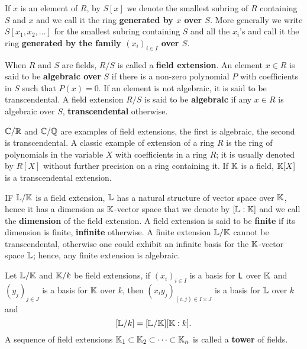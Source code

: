 If $x$ is an element of $R$, by $S[x]$ we denote the smallest subring
of $R$ containing $S$ and $x$ and we call it the ring
\textbf{generated by $x$ over $S$}. More
generally we write $S[x_1,x_2,\ldots]$ for the smallest subring
containing $S$ and all the $x_i$'s and call it the ring \textbf{generated by
the family $(x_i)_{i\in I}$ over $S$}.

When $R$ and $S$ are fields, $R/S$ is called a
 \textbf{field
  extension}. An element $x\in R$ is said to be
\textbf{algebraic over} $S$ if there is a
non-zero polynomial $P$ with coefficients in $S$ such that
$P(x)=0$. If an element is not algebraic, it is said to be
transcendental. A field extension $R/S$
is said to be \textbf{algebraic} if any
$x\in R$ is algebraic over $S$,
\textbf{transcendental} otherwise.

$\mathbb{C}/\mathbb{R}$ and $\mathbb{C}/\mathbb{Q}$ are examples of field extensions, the first is
algebraic, the second is transcendental. A classic example of
extension of a ring $R$ is the ring of polynomials in the variable $X$
with coefficients in a ring $R$; it is usually denoted by $R[X]$
without further precision on a ring containing it. If $\mathbb{K}$ is a field,
$\mathbb{K}[X]$ is a transcendental extension.

IF $\mathbb{L}/\mathbb{K}$ is a field extension, $\mathbb{L}$ has a natural structure of
vector space over $\mathbb{K}$, hence it has a dimension as $\mathbb{K}$-vector space
that we denote by $[\mathbb{L}:\mathbb{K}]$ and we call the
\textbf{dimension} of the field
extension. A field extension is said to be
\textbf{finite} if its dimension is
finite, \textbf{infinite} otherwise. A
finite extension $\mathbb{L}/\mathbb{K}$ cannot be transcendental, otherwise one
could exhibit an infinite basis for the $\mathbb{K}$-vector space $\mathbb{L}$;
hence, any finite extension is algebraic.

Let $\mathbb{L}/\mathbb{K}$ and $\mathbb{K}/k$ be field extensions, if $(x_i)_{i\in I}$ is a
basis for $\mathsf{L}$ over $\mathbb{K}$ and $(y_j)_{j\in J}$ is a basis for $\mathbb{K}$ over
$k$, then $(x_iy_j)_{(i,j)\in I\times J}$ is a basis for $\mathbb{L}$ over $k$ and
\[[\mathbb{L}/k] = [\mathbb{L}/\mathbb{K}][\mathbb{K}:k] \text{.}\] A sequence of field extensions
$\mathbb{K}_1\subset\mathbb{K}_2\subset\cdots\subset\mathbb{K}_n$ is called a
 \textbf{tower} of
fields.

